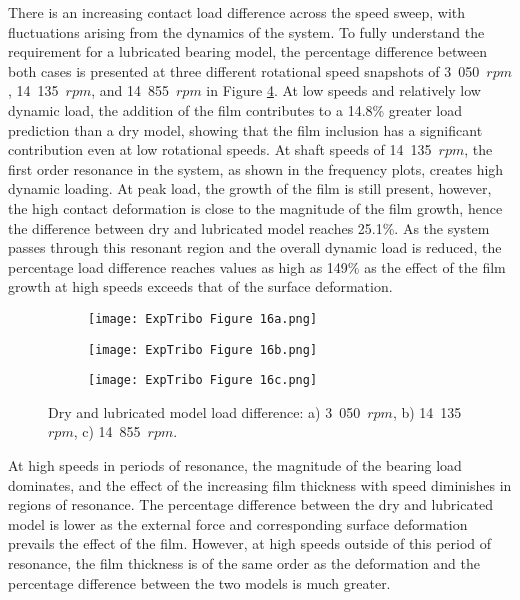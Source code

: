 There is an increasing contact load difference across the speed sweep, with fluctuations arising from the dynamics of the system. To fully understand the requirement for a lubricated bearing model, the percentage difference between both cases is presented at three different rotational speed snapshots of 3~050~$rpm$, 14~135~$rpm$, and 14~855~$rpm$ in Figure \ref{Dry and lubricated model load difference}. At low speeds and relatively low dynamic load, the addition of the film contributes to a 14.8\% greater load prediction than a dry model, showing that the film inclusion has a significant contribution even at low rotational speeds. At shaft speeds of 14~135~$rpm$, the first order resonance in the system, as shown in the frequency plots, creates high dynamic loading. At peak load, the growth of the film is still present, however, the high contact deformation is close to the magnitude of the film growth, hence the difference between dry and lubricated model reaches 25.1\%. As the system passes through this resonant region and the overall dynamic load is reduced, the percentage load difference reaches values as high as 149\% as the effect of the film growth at high speeds exceeds that of the surface deformation.

\begin{figure}
	\centering
	\begin{subfigure}{0.75\textwidth}
		\centering
		\texttt{[image: ExpTribo Figure 16a.png]}
		\caption{}
		\label{3050rpm}
	\end{subfigure}
	\hfill
	\begin{subfigure}{0.75\textwidth}
		\centering
		\texttt{[image: ExpTribo Figure 16b.png]}
		\caption{}
		\label{14135rpm}
	\end{subfigure}
	\vfill
	\begin{subfigure}{0.75\textwidth}
		\centering
		\texttt{[image: ExpTribo Figure 16c.png]}
		\caption{}
		\label{14855rpm}
	\end{subfigure}
	\caption{Dry and lubricated model load difference: a) 3~050~$rpm$, b) 14~135~$rpm$, c) 14~855~$rpm$.}
	\label{Dry and lubricated model load difference}
\end{figure}

At high speeds in periods of resonance, the magnitude of the bearing load dominates, and the effect of the increasing film thickness with speed diminishes in regions of resonance. The percentage difference between the dry and lubricated model is lower as the external force and corresponding surface deformation prevails the effect of the film. However, at high speeds outside of this period of resonance, the film thickness is of the same order as the deformation and the percentage difference between the two models is much greater.  

